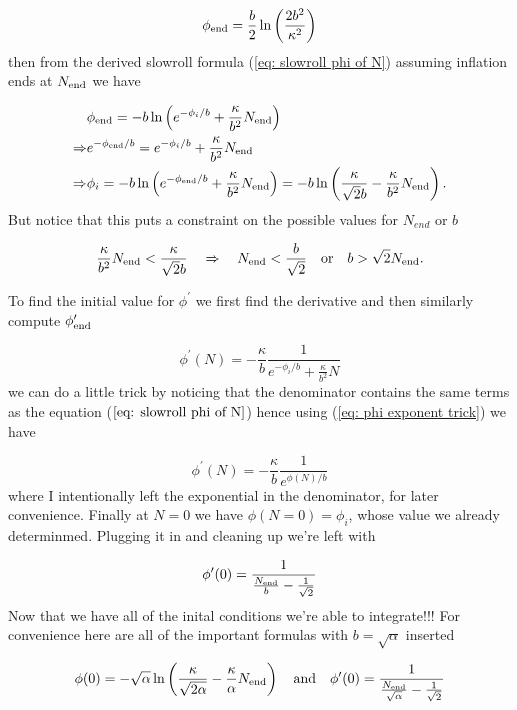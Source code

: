 \begin{equation*}
    \phi_{\rm end} = \frac{b}{2} \ln \left( \frac{2 b^2}{\kappa^2} \right)
\end{equation*}
then from the derived slowroll formula (\ref{eq: slowroll phi of N}) assuming inflation ends at $N_{\rm end}$ we have

\begin{align}
    &\phi_{\rm end} = -b \ln \left( e^{-\phi_{i}/b} + \frac{\kappa}{b^2} N_{\rm end}\right) \notag \\
    \Rightarrow & e^{-\phi_{\rm end}/b} = e^{-\phi_{i}/b} + \frac{\kappa}{b^2} N_{\rm end} \label{eq: phi exponent trick} \\
    \Rightarrow & \phi_{i} = -b \ln \left( e^{-\phi_{\rm end}/b} + \frac{\kappa}{b^2} N_{\rm end} \right) = -b \ln \left( \frac{\kappa}{\sqrt{2} b} - \frac{\kappa}{b^2}N_{\rm end} \right). \notag
\end{align}
But notice that this puts a constraint on the possible values for $N_{end}$ or $b$

\begin{equation*}
    \frac{\kappa}{b^2} N_{\rm end} < \frac{\kappa}{\sqrt{2} b} \quad \Rightarrow \quad  N_{\rm end} < \frac{b}{\sqrt{2}} \quad \text{or} \quad b > \sqrt{2} N_{\rm end}.
\end{equation*}

To find the initial value for $\phi^{\prime}$ we first find the derivative and then similarly compute $\phi^{\prime}_{\rm end}$

\begin{equation*}
    \phi^{\prime}(N) = -\frac{\kappa}{b} \frac{1}{e^{- \phi_i/b} + \frac{\kappa}{b^2}N}
\end{equation*}
we can do a little trick by noticing that the denominator contains the same terms as the equation ($\ref{eq: slowroll phi of N}$) hence using (\ref{eq: phi exponent trick}) we have

\begin{equation*}
    \phi^{\prime} (N) = -\frac{\kappa}{b} \frac{1}{e^{\phi(N)/b}}
\end{equation*}
where I intentionally left the exponential in the denominator, for later convenience. Finally at $N=0$ we have $\phi(N=0)=\phi_i$, whose value we already determinmed. Plugging it in and cleaning up we're left with

\begin{equation*}
    \phi^{\prime} (0) = \frac{1}{\frac{N_{\rm end}}{b} - \frac{1}{\sqrt{2}}}
\end{equation*}
Now that we have all of the inital conditions we're able to integrate!!! For convenience here are all of the important formulas with $b=\sqrt{\alpha}$ inserted

\begin{equation*}
    \phi(0) = -\sqrt{\alpha} \ln \left( \frac{\kappa}{\sqrt{2 \alpha}} - \frac{\kappa}{\alpha}N_{\rm end} \right) \quad \text{and} \quad \phi^{\prime} (0) = \frac{1}{\frac{N_{\rm end}}{\sqrt{\alpha}} - \frac{1}{\sqrt{2}}}
\end{equation*}